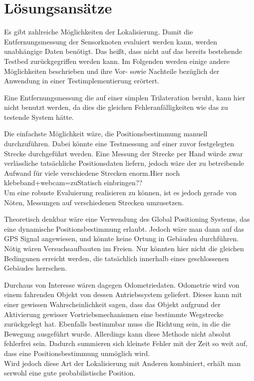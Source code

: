 \section{Lösungsansätze}
\label{sec:loesungsansaetze}

Es gibt zahlreiche Möglichkeiten der Lokalisierung. Damit die Entfernungsmessung der Sensorknoten evaluiert werden kann, werden unabhängige Daten benötigt. Das heißt, dass nicht auf das bereits bestehende Testbed zurückgegriffen werden kann. Im Folgenden werden einige andere Möglichkeiten beschrieben und ihre Vor- sowie Nachteile bezüglich der Anwendung in einer Testimplementierung erörtert. 

{\color{red}Eine Entfernungsmessung die auf einer simplen Trilateration beruht, kann hier nicht benutzt werden, da dies die gleichen Fehleranfälligkeiten wie das zu testende System hätte.}

Die einfachste Möglichkeit wäre, die Positionsbestimmung manuell durchzuführen. Dabei könnte eine Testmessung auf einer zuvor festgelegten Strecke durchgeführt werden. Eine Messung der Strecke per Hand würde zwar verlässliche tatsächliche Positionsdaten liefern, jedoch wäre der zu betreibende Aufwand für viele verschiedene Strecken enorm.{\color{red}Hier noch klebeband+webcam=zuStatisch einbringen??}\\
Um eine robuste Evaluierung realisieren zu können, ist es jedoch gerade von Nöten, Messungen auf verschiedenen Strecken umzusetzen.

Theoretisch denkbar wäre eine Verwendung des Global Positioning Systems, das eine dynamische Positionsbestimmung erlaubt. Jedoch wäre man dann auf das GPS Signal angewiesen, und könnte keine Ortung in Gebäuden durchführen. Nötig wären Versuchsaufbauten im Freien. Nur könnten hier nicht die gleichen Bedingunen erreicht werden, die tatsächlich innerhalb eines geschlossenen Gebäudes herrschen.

Durchaus von Interesse wären dagegen Odometriedaten. Odometrie wird von einem fahrenden Objekt von dessen Antriebssystem geliefert. Dieses kann mit einer gewissen Wahrscheinlichkeit sagen, dass das Objekt aufgrund der Aktivierung gewisser Vortriebsmechanismen eine bestimmte Wegstrecke zurückgelegt hat. Ebenfalls bestimmbar muss die Richtung sein, in die die Bewegung ausgeführt wurde. Allerdings kann diese Methode nicht absolut fehlerfrei sein. Dadurch summieren sich kleinste Fehler mit der Zeit so weit auf, dass eine Positionsbestimmung unmöglich wird.\\
Wird jedoch diese Art der Lokalisierung mit Anderen kombiniert, erhält man serwohl eine gute probabilistische Position.

